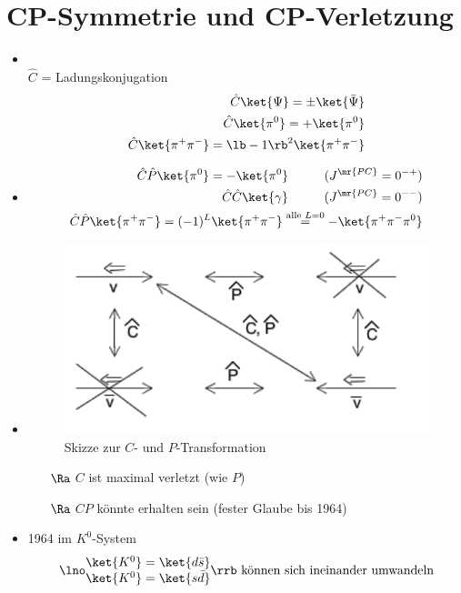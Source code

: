\section{CP-Symmetrie und CP-Verletzung}
\begin{itemize}
\item {}\\
$\hat{C}$ = Ladungskonjugation
\begin{align*}
\hat{C} \ket{\Psi} = \pm \ket{\bar{\Psi}}\\
\hat{C}\ket{\pi^0} = + \ket{\pi^0}\\
\hat{C}\ket{\pi^+ \pi^-} = \lb -1\rb ^2 \ket{\pi^+ \pi^-}
\end{align*}
\item {}
\begin{align}\begin{split}
\hat{C}\hat{P} \ket{\pi^0} = - \ket{\pi^0} \hspace*{1cm} (J^\mr{PC} = 0^{-+})\\
\hat{C}\hat{C} \ket{\gamma} \hspace*{1cm} (J^\mr{PC} = 0^{--})\\
\hat{C}\hat{P} \ket{\pi^+\pi^-} = (-1)^L \ket{\pi^+ \pi^-} \overset{\text{alle }L=0}{=} - \ket{\pi^+ \pi^-\pi^0}
\end{split}\end{align}
\newpage

\item {}

\begin{figure}[!ht]
\centering
\includegraphics[width=.65\textwidth]{imgs/ep5-fig-8-10.pdf}
\caption{Skizze zur $C$- und $P$-Transformation \label{fig:8.10}}
\end{figure}

\begin{itemize}
\item[$\Ra$] $C$ ist maximal verletzt (wie $P$)
\item[$\Ra$] $CP$ könnte erhalten sein (fester \glqq Glaube\grqq{} bis 1964)
\end{itemize}
\item {} 1964 im $K^0$-System
\begin{align*}
\lno \begin{matrix}
\ket{K^0} = \ket{d\bar{s}}\\ \ket{K^0} = \ket{ s\bar{d}}
\end{matrix}\rrb\text{ können sich ineinander umwandeln}
\end{align*}


\end{itemize}
